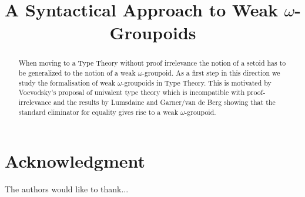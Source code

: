 \documentclass[conference]{IEEEtran}
\begin{document}
\title{A Syntactical Approach to Weak $\omega$-Groupoids}

\author{
\and
{}
}

\maketitle


\begin{abstract}
  When moving to a Type Theory without proof irrelevance the notion of
  a setoid has to be generalized to the notion of a weak
  $\omega$-groupoid. As a first step in this direction we study the
  formalisation of weak $\omega$-groupoids in Type Theory. This is
  motivated by Voevodsky's proposal of univalent type theory which is
  incompatible with proof-irrelevance and the results by Lumsdaine and
  Garner/van de Berg showing that the standard eliminator for equality
  gives rise to a weak $\omega$-groupoid.
\end{abstract}
\IEEEpeerreviewmaketitle

















  

\section*{Acknowledgment}


The authors would like to thank...


%
%
\end{document}
